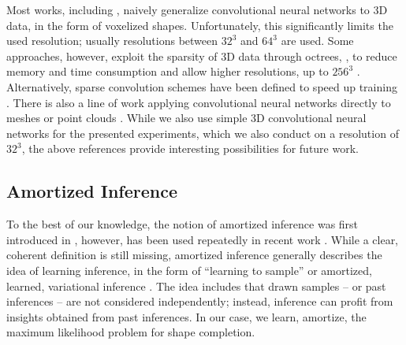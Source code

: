 Most works, including \cite{WuTenenbaum:2016,SmithMeger:2017,WuSongXiao:2015,
BrockWeston:2016,SharmaFritz:2016,DaiNiessner:2016,GirdharGupta:2016,
GarciaGarciaLopez:2016,MaturanaScherer:2015}, naively
generalize convolutional neural networks to 3D data, \eg in the form of voxelized shapes.
Unfortunately, this significantly limits the used resolution; usually resolutions between
$32^3$ and $64^3$ are used. Some approaches, however, exploit the sparsity of
3D data through octrees, \eg
\cite{WangTong:2017,RieglerGeiger:2016,RieglerGeiger:2017,TatarchenkoBrox:2017},
to reduce memory and time consumption and allow higher resolutions, \eg up to
$256^3$ \cite{RieglerGeiger:2016}. Alternatively, sparse convolution schemes have
been defined to speed up training \cite{LiGuibas:2016,EngelckePosner:2017,Graham:2015}.
There is also a line of work applying convolutional neural networks directly to meshes
\cite{GuoChen:2015,BoscainiVandergheynst:2015,BrunaLeCun:2013}
or point clouds \cite{QiSuGuibas:2016a,FanSuGuibas:2016,QiYiSuGuibas:2017}. While we also
use simple 3D convolutional neural networks for the presented experiments,
which we also conduct on a resolution of $32^3$, the above references provide
interesting possibilities for future work.

\subsection{Amortized Inference}

To the best of our knowledge, the notion of amortized inference
was first introduced in \cite{GershamGoodman:2014}, however, has been used repeatedly
in recent work
\cite{KingmaWelling:2013,RezendeMohamed:2015,WangLiu:2016,
RezendeMohamedWierstra:2014,RitchieGoodman:2016}. While a clear, coherent definition
is still missing, amortized inference generally describes the idea of learning
inference, \eg in the form of ``learning to sample'' \cite{WangLiu:2016}
or amortized, \ie learned, variational inference \cite{KingmaWelling:2013,
RezendeMohamed:2015}. The idea includes that drawn samples -- or past inferences -- 
are not considered independently; instead, inference can profit from insights
obtained from past inferences. In our case, we learn, \ie amortize, the 
maximum likelihood problem for shape completion.
